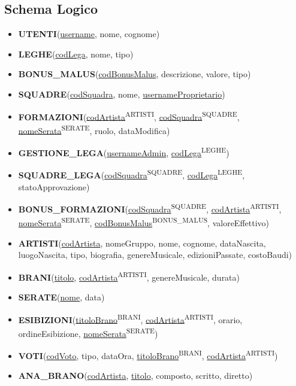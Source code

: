 \documentclass[a4paper,12pt]{article}
\begin{document}
\subsection{Schema Logico}
	\begin{itemize}
		\item \textbf{UTENTI}(\underline{username}, nome, cognome)
		\item \textbf{LEGHE}(\underline{codLega}, nome, tipo)
		\item \textbf{BONUS\_MALUS}(\underline{codBonusMalus}, descrizione, valore, tipo)
		\item \textbf{SQUADRE}(\underline{codSquadra}, nome, \underline{usernameProprietario})
		\item \textbf{FORMAZIONI}(\underline{codArtista}\textsuperscript{ARTISTI}, \underline{codSquadra}\textsuperscript{SQUADRE}, \underline{nomeSerata}\textsuperscript{SERATE}, ruolo, dataModifica)
		
		\item \textbf{GESTIONE\_LEGA}(\underline{usernameAdmin}, \underline{codLega}\textsuperscript{LEGHE})
		\item \textbf{SQUADRE\_LEGA}(\underline{codSquadra}\textsuperscript{SQUADRE}, \underline{codLega}\textsuperscript{LEGHE}, statoApprovazione)
		\item \textbf{BONUS\_FORMAZIONI}(\underline{codSquadra}\textsuperscript{SQUADRE}, \underline{codArtista}\textsuperscript{ARTISTI}, \underline{nomeSerata}\textsuperscript{SERATE}, \underline{codBonusMalus}\textsuperscript{BONUS\_MALUS}, valoreEffettivo)
		
		\item \textbf{ARTISTI}(\underline{codArtista}, nomeGruppo, nome, cognome, dataNascita, luogoNascita, tipo, biografia, genereMusicale, edizioniPassate, costoBaudi)
		\item \textbf{BRANI}(\underline{titolo}, \underline{codArtista}\textsuperscript{ARTISTI}, genereMusicale, durata)
		\item \textbf{SERATE}(\underline{nome}, data)
		\item \textbf{ESIBIZIONI}(\underline{titoloBrano}\textsuperscript{BRANI}, \underline{codArtista}\textsuperscript{ARTISTI}, orario, ordineEsibizione, \underline{nomeSerata}\textsuperscript{SERATE})
		\item \textbf{VOTI}(\underline{codVoto}, tipo, dataOra, \underline{titoloBrano}\textsuperscript{BRANI}, \underline{codArtista}\textsuperscript{ARTISTI})
		\item \textbf{ANA\_BRANO}(\underline{codArtista}, \underline{titolo}, composto, scritto, diretto) 
	\end{itemize}
	
\end{document}
